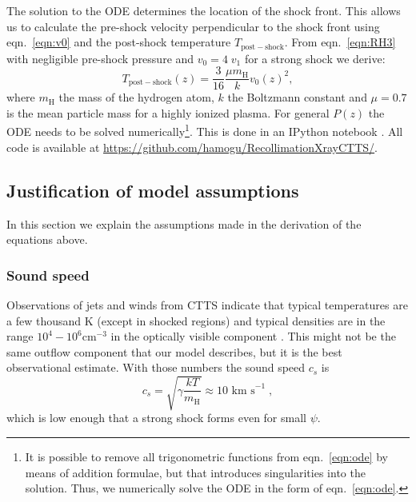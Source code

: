 \documentclass{emulateapj}
\begin{document}
The solution to the ODE determines the location of the shock front. This allows us to calculate the pre-shock velocity perpendicular to the shock front using eqn.~\ref{eqn:v0} and the post-shock temperature $T_{\mathrm{post-shock}}$. From eqn.~\ref{eqn:RH3} with negligible pre-shock pressure and $v_0=4\;v_1$ for a strong shock we derive:
\begin{equation}
T_{\mathrm{post-shock}}(z) = \frac{3}{16} \frac{\mu m_{\textrm{H}}}{k} v_0(z)^2,\label{eqn:T}
\end{equation}
where $m_{\textrm{H}}$ the mass of the hydrogen atom, $k$ the Boltzmann constant and $\mu=0.7$ is the mean particle mass for a highly ionized plasma. For general $P(z)$ the ODE needs to be solved numerically\footnote{It is possible to remove all trigonometric functions from eqn.~\ref{eqn:ode} by means of addition formulae, but that introduces singularities into the solution. Thus, we numerically solve the ODE in the form of eqn.~\ref{eqn:ode}.}. This is done in an IPython notebook \citep{PER-GRA:2007}. All code is available at \url{https://github.com/hamogu/RecollimationXrayCTTS/}.


\subsection{Justification of model assumptions}
\label{sect:modelassumptions}
In this section we explain the assumptions made in the derivation of the equations above.

\subsubsection{Sound speed}
Observations of jets and winds from CTTS indicate that typical temperatures are a few thousand K (except in shocked regions) and typical densities are in the range $10^4-10^6 \mathrm{ cm}^{-3}$ in the optically visible component \citep[e.g.][]{2000A&A...356L..41L,2007ApJ...657..897K}. This might not be the same outflow component that our model describes, but it is the best observational estimate. With those numbers the sound speed $c_s$ is
\begin{equation}
c_s = \sqrt{\gamma \frac{k T}{m_{\textrm{H}}}} \approx 10 \textrm{ km s}^{-1} \; ,
\end{equation}
which is low enough that a strong shock forms even for small $\psi$.
\end{document}
